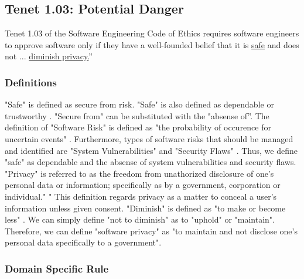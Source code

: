 \subsection{Tenet 1.03: Potential Danger}
Tenet 1.03 of the Software Engineering Code of Ethics requires software engineers to approve software only if they have a well-founded belief that it is \uline{safe} and does not ... \uline{diminish privacy.}'' \cite{code} 

\subsubsection{Definitions}
"Safe" is defined as secure from risk. \cite{define-safe} "Safe" is also defined as dependable or trustworthy \cite{define-safe2}. 
"Secure from" can be substituted with the "absense of''.
The definition of "Software Risk" is defined  as "the probability of occurence for uncertain events" \cite{define-software-risk}. Furthermore, types of software risks that should be managed and identified are "System Vulnerabilities" and "Security Flaws" \cite{define-software-risk}.
Thus, we define "safe" as dependable and the absense of system vulnerabilities and security flaws.
"Privacy" is referred to as the freedom from unathorized disclosure of one's personal data or information; specifically as by a government, corporation or individual." \cite{define-privacy}" This definition regards privacy as a matter to conceal a user's information unless given consent. "Diminish" is defined as "to make or become less" \cite{define-diminish}. We can simply define "not to diminish" as to "uphold" or "maintain". Therefore, we can define "software privacy" as "to maintain and not disclose one's personal data specifically to a government".

\subsubsection{Domain Specific Rule}





















